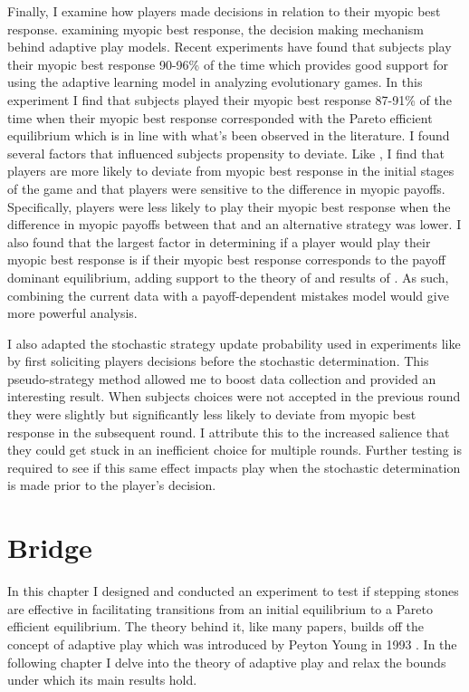Finally, I examine how players made decisions in relation to their myopic best response.  examining myopic best response, the decision making mechanism behind adaptive play models. Recent experiments have found that subjects play their myopic best response 90-96\% of the time which provides good support for using the adaptive learning model in analyzing evolutionary games. In this experiment I find that subjects played their myopic best response 87-91\% of the time when their myopic best response corresponded with the Pareto efficient equilibrium which is in line with what's been observed in the literature.
I found several factors that influenced subjects propensity to deviate. Like \cite{lim2016experimental}, I find that players are more likely to deviate from myopic best response in the initial stages of the game and that players were sensitive to the difference in myopic payoffs. Specifically, players were less likely to play their myopic best response when the difference in myopic payoffs between that and an alternative strategy was lower. I also found that the largest factor in determining if a player would play their myopic best response is if their myopic best response corresponds to the payoff dominant equilibrium, adding support to the theory of \cite{harsanyi1988general} and results of \cite{jagau2022}. As such, combining the current data with a payoff-dependent mistakes model would give more powerful analysis.

I also adapted the stochastic strategy update probability used in experiments like \cite{hwang2018conventional} by first soliciting players decisions before the stochastic determination. This pseudo-strategy method allowed me to boost data collection and provided an interesting result. When subjects choices were not accepted in the previous round they were slightly but significantly less likely to deviate from myopic best response in the subsequent round. I attribute this to the increased salience that they could get stuck in an inefficient choice for multiple rounds. Further testing is required to see if this same effect impacts play when the stochastic determination is made prior to the player's decision. 

\section{Bridge}
In this chapter I designed and conducted an experiment to test if stepping stones are effective in facilitating transitions from an initial equilibrium to a Pareto efficient equilibrium. The theory behind it, like many papers, builds off the concept of adaptive play which was introduced by Peyton Young in 1993 \cite{young1993evolution}. In the following chapter I delve into the theory of adaptive play and relax the bounds under which its main results hold.



